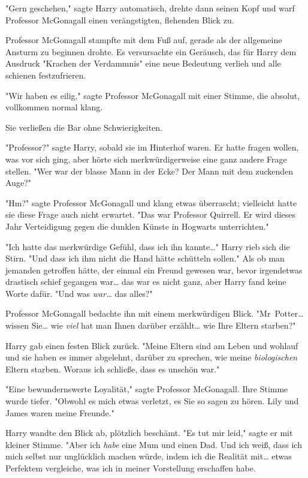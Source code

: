 {"Gern geschehen," sagte Harry automatisch, drehte dann seinen Kopf und warf Professor McGonagall einen verängstigten, flehenden Blick zu.

Professor McGonagall stampfte mit dem Fuß auf, gerade als der allgemeine Ansturm zu beginnen drohte. Es versursachte ein Geräusch, das für Harry dem Ausdruck "Krachen der Verdammnis" eine neue Bedeutung verlieh und alle schienen festzufrieren.

"Wir haben es eilig," sagte Professor McGonagall mit einer Stimme, die absolut, vollkommen normal klang.

Sie verließen die Bar ohne Schwierigkeiten.

"Professor?" sagte Harry, sobald sie im Hinterhof waren. Er hatte fragen wollen, was vor sich ging, aber hörte sich merkwürdigerweise eine ganz andere Frage stellen. "Wer war der blasse Mann in der Ecke? Der Mann mit dem zuckenden Auge?"

"Hm?" sagte Professor McGonagall und klang etwas überrascht; vielleicht hatte sie diese Frage auch nicht erwartet. "Das war Professor Quirrell. Er wird dieses Jahr Verteidigung gegen die dunklen Künste in Hogwarts unterrichten."

"Ich hatte das merkwürdige Gefühl, dass ich ihn kannte…" Harry rieb sich die Stirn. "Und dass ich ihm nicht die Hand hätte schütteln sollen." Als ob man jemanden getroffen hätte, der einmal ein Freund gewesen war, bevor irgendetwas drastisch schief gegangen war… das war es nicht ganz, aber Harry fand keine Worte dafür. "Und was \emph{war…} das alles?"

Professor McGonagall bedachte ihn mit einem merkwürdigen Blick. "Mr~Potter… wissen Sie… wie \emph{viel} hat man Ihnen darüber erzählt… wie Ihre Eltern starben?"

Harry gab einen festen Blick zurück. "Meine Eltern sind am Leben und wohlauf und sie haben es immer abgelehnt, darüber zu sprechen, wie meine \emph{biologischen} Eltern starben. Woraus ich schließe, dass es unschön war."

"Eine bewundernswerte Loyalität," sagte Professor McGonagall. Ihre Stimme wurde tiefer. "Obwohl es mich etwas verletzt, es Sie so sagen zu hören. Lily und James waren meine Freunde."

Harry wandte den Blick ab, plötzlich beschämt. "Es tut mir leid," sagte er mit kleiner Stimme. "Aber ich \emph{habe} eine Mum und einen Dad. Und ich weiß, dass ich mich selbst nur unglücklich machen würde, indem ich die Realität mit… etwas Perfektem vergleiche, was ich in meiner Vorstellung erschaffen habe.

}
